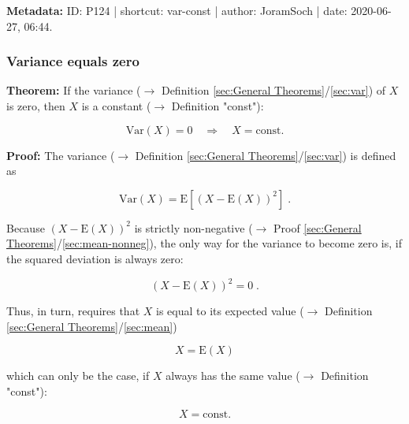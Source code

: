 \documentclass[a4paper,12pt,twoside]{book}
\begin{document}
\vspace{1em}
\textbf{Metadata:} ID: P124 | shortcut: var-const | author: JoramSoch | date: 2020-06-27, 06:44.
\vspace{1em}



\subsubsection[\textbf{Variance equals zero}]{Variance equals zero} \label{sec:var-zero}
\setcounter{equation}{0}

\textbf{Theorem:} If the variance ($\rightarrow$ Definition \ref{sec:General Theorems}/\ref{sec:var}) of $X$ is zero, then $X$ is a constant ($\rightarrow$ Definition "const"):

\begin{equation} \label{eq:var-zero-var-zero}
\mathrm{Var}(X) = 0 \quad \Rightarrow \quad X = \text{const.}
\end{equation}


\vspace{1em}
\textbf{Proof:} The variance ($\rightarrow$ Definition \ref{sec:General Theorems}/\ref{sec:var}) is defined as

\begin{equation} \label{eq:var-zero-var}
\mathrm{Var}(X) = \mathrm{E}\left[ (X-\mathrm{E}(X))^2 \right] \; .
\end{equation}

Because $(X-\mathrm{E}(X))^2$ is strictly non-negative ($\rightarrow$ Proof \ref{sec:General Theorems}/\ref{sec:mean-nonneg}), the only way for the variance to become zero is, if the squared deviation is always zero:

\begin{equation} \label{eq:var-zero-sqr-dev-zero}
(X-\mathrm{E}(X))^2 = 0 \; .
\end{equation}

Thus, in turn, requires that $X$ is equal to its expected value ($\rightarrow$ Definition \ref{sec:General Theorems}/\ref{sec:mean})

\begin{equation} \label{eq:var-zero-X-eq-E-X}
X = \mathrm{E}(X)
\end{equation}

which can only be the case, if $X$ always has the same value ($\rightarrow$ Definition "const"):

\begin{equation} \label{eq:var-zero-X-const}
X = \text{const.}
\end{equation}
\end{document}
